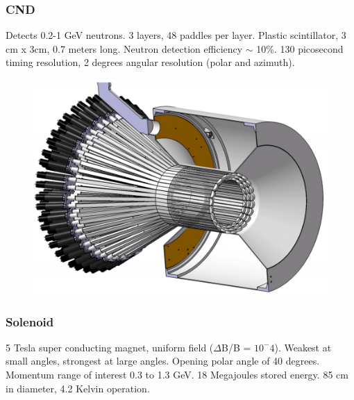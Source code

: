  
		\subsubsection{CND}
		    Detects 0.2-1 GeV neutrons. 3 layers, 48 paddles per layer. Plastic scintillator, 3 cm x 3cm, 0.7 meters  long. Neutron detection efficiency $\sim$ 10\%. 130 picosecond timing resolution, 2 degrees angular resolution (polar and azimuth).
            
            						
			 \begin{figure}[H]
    			\centering
    			\includegraphics[width=12cm]{Chapters/Ch2-Experiment/clas-12-system/pics/cd/CND.PNG}
			\end{figure} 

		\subsubsection{Solenoid}
		    5 Tesla super conducting magnet, uniform field ($\Delta$B/B = $10^-4$). Weakest at small angles, strongest at large angles. Opening polar angle of 40 degrees. Momentum range of interest 0.3 to 1.3 GeV. 18 Megajoules stored energy. 85 cm in diameter, 4.2 Kelvin operation. 
		    
    